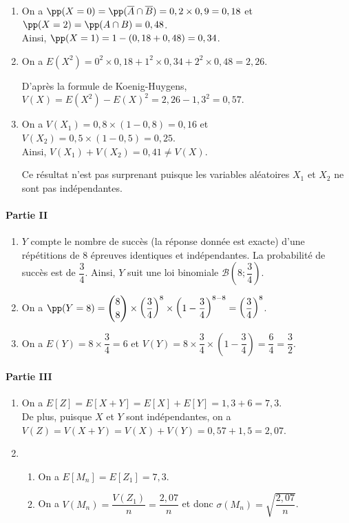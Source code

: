 \documentclass[11pt,fleqn, openany]{book} %
\begin{document}
\begin{solution}
\begin{enumerate}
\item On a $\pp(X=0)=\pp(\overline{A}\cap \overline{B})=0,2 \times 0,9=0,18$ et $\pp(X=2)=\pp(A\cap B)=0,48$. \\Ainsi, $\pp(X=1)=1-(0,18+0,48)=0,34$.

\item On a $E(X^2)=0^2 \times 0,18 + 1^2 \times 0,34 + 2^2 \times 0,48 = 2,26$. 

D'après la formule de Koenig-Huygens, $V(X)=E(X^2)-E(X)^2=2,26-1,3^2=0,57$.

\item On a $V(X_1)=0,8 \times(1-0,8)=0,16$ et $V(X_2)=0,5 \times (1-0,5)=0,25$.\\ Ainsi, $V(X_1)+V(X_2)=0,41\neq V(X)$.

Ce résultat n'est pas surprenant puisque les variables aléatoires $X_1$ et $X_2$ ne sont pas indépendantes.

\end{enumerate}

\paragraph{Partie II}

\begin{enumerate}
\item $Y$ compte le nombre de succès (la réponse donnée est exacte) d'une répétitions de 8 épreuves identiques et indépendantes. La probabilité de succès est de $\dfrac{3}{4}$. Ainsi, $Y$ suit une loi binomiale $\mathcal{B}\left(8;\dfrac{3}{4}\right)$.
\item On a $\pp(Y=8)=\dbinom{8}{8} \times \left(\dfrac{3}{4}\right)^8\times\left(1-\dfrac{3}{4}\right)^{8-8}=\left(\dfrac{3}{4}\right)^8$.
\item On a $E(Y)=8 \times \dfrac{3}{4}=6$ et $V(Y)=8 \times \dfrac{3}{4} \times \left(1-\dfrac{3}{4}\right)=\dfrac{6}{4}=\dfrac{3}{2}$.
\end{enumerate}

\paragraph{Partie III}

\begin{enumerate}
\item On a $E[Z]=E[X+Y]=E[X]+E[Y] = 1,3+6=7,3$.\\ De plus, puisque $X$ et $Y$ sont indépendantes, on a $V(Z)=V(X+Y)=V(X)+V(Y)=0,57+1,5=2,07$.
\item \begin{enumerate}
\item On a $E[M_n]=E[Z_1]=7,3$.
\item On a $V(M_n)=\dfrac{V(Z_1)}{n}=\dfrac{2,07}{n}$ et donc $\sigma(M_n)=\sqrt{\dfrac{2,07}{n}}$.


\end{enumerate}
\end{enumerate}
\end{solution}
\end{document}
